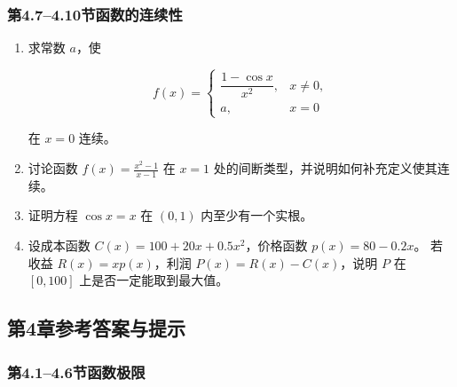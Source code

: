 \documentclass[fontset=fandol]{ctexart}
\begin{document}
\subsubsection*{第4.7--4.10节\quad 函数的连续性}



\begin{enumerate}[label=\textbf{练习\arabic*.},leftmargin=2.2em]

\item 求常数 $a$，使

\[

f(x)=

\begin{cases}

\dfrac{1-\cos x}{x^2},&x\neq0,\\

a,&x=0

\end{cases}

\]

在 $x=0$ 连续。

\item 讨论函数 $f(x)=\frac{x^2-1}{x-1}$ 在 $x=1$ 处的间断类型，并说明如何补充定义使其连续。

\item 证明方程 $\cos x=x$ 在 $(0,1)$ 内至少有一个实根。

\item 设成本函数 $C(x)=100+20x+0.5x^2$，价格函数 $p(x)=80-0.2x$。 若收益 $R(x)=xp(x)$，利润 $P(x)=R(x)-C(x)$，说明 $P$ 在 $[0,100]$ 上是否一定能取到最大值。

\end{enumerate}



\subsection*{第4章参考答案与提示}




\subsubsection*{第4.1--4.6节\quad 函数极限}
\end{document}
